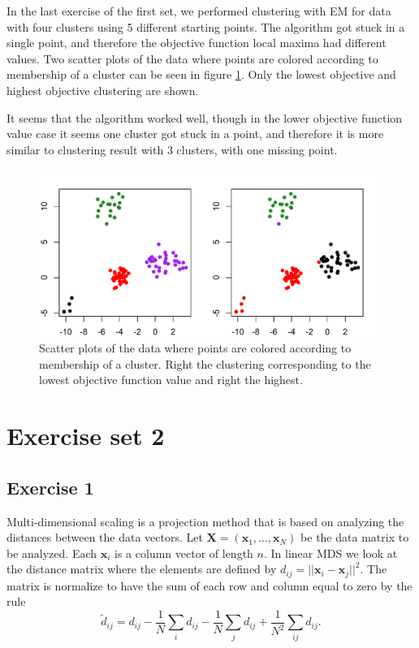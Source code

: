 \documentclass{article}
\renewcommand\vec[1]{\ensuremath{\mathbf{#1}}}
\begin{document}
In the last exercise of the first set, we performed clustering with EM
for data with four clusters using 5 different starting points. The
algorithm got stuck in a single point, and therefore the objective
function local maxima had different values. Two scatter plots of the data
where points are colored according to membership of a cluster can be
seen in figure \ref{fig:4cluster}. Only the lowest objective and
highest objective clustering are shown.

It seems that the algorithm worked well, though in the lower objective
function value case it seems one cluster got stuck in a point, and
therefore it is more similar to clustering result with 3 clusters,
with one missing point.

\begin{figure}[h!]
	\includegraphics[width=\columnwidth]{4cluster.pdf}
	\caption{Scatter plots of the data
where points are colored according to membership of a cluster. Right
the clustering corresponding to the lowest objective function value and
right the highest.}\label{fig:4cluster}
\end{figure}



\section{Exercise set 2}
\subsection{Exercise 1}\label{sec:ex21}
Multi-dimensional scaling is a projection method that is based on analyzing the distances between the data vectors.
Let $\vec X=(\vec x_1,\dots,\vec x_N)$ be the data matrix to be analyzed.
Each $\vec x_i$ is a column vector of length $n$.
In linear MDS we look at the distance matrix where the elements are defined by $d_{ij}=||\vec x_i-\vec x_j||^2$.
The matrix is normalize to have the sum of each row and column equal to zero by the rule
$$ \tilde{d}_{ij} = d_{ij} - \frac{1}{N}\sum_id_{ij} - \frac{1}{N}\sum_jd_{ij} + \frac{1}{N^2}\sum_{ij}d_{ij}. $$
\end{document}
